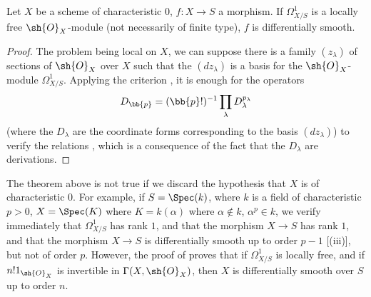 \begin{theorem}[16.12.2]
\label{IV.16.12.2}
Let $X$ be a scheme of characteristic $0$, $f:X \to S$ a morphism.
If $\Omega_{X/S}^1$ is a locally free $\sh{O}_X$-module (not necessarily of finite type), $f$ is differentially smooth.
\end{theorem}

\begin{proof}
The problem being local on $X$, we can suppose there is a family $(z_\lambda)$ of sections of $\sh{O}_X$ over $X$ such that the $(dz_\lambda)$ is a basis for the $\sh{O}_X$-module $\Omega_{X/S}^1$.
Applying the criterion , it is enough for the operators 
\[
  D_\bb{p} = (\bb{p}!)^{-1} \prod_\lambda D_\lambda^{p_\lambda}
\]
(where the $D_\lambda$ are the coordinate forms corresponding to the basis $(dz_\lambda)$) to verify the relations , which is a consequence of the fact that the $D_\lambda$ are derivations.
\end{proof}

\begin{env}[16.12.3]
\label{IV.16.12.3}
The theorem above is not true if we discard the hypothesis that $X$ is of characteristic $0$.
For example, if $S = \Spec(k)$, where $k$ is a field of characteristic $p > 0$, $X = \Spec(K)$ where $K = k(\alpha)$ where $\alpha \notin k$, $\alpha^p \in k$, we verify immediately 
that $\Omega_{X/S}^1$ has rank $1$, and that the morphism $X \to S$ has rank $1$, and that the morphism $X \to S$ is differentially smooth up to order $p - 1$ [(iii)], but not of order $p$.
However, the proof of  proves that if $\Omega_{X/S}^1$ is locally free, and if $n! 1_{\sh{O}_X}$ is invertible in $\Gamma(X, \sh{O}_X)$, then $X$ is differentially smooth over $S$ up to order $n$.
\end{env}
